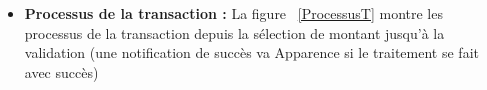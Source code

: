 \begin{itemize}[label=$\ast$]
	
	\item \textbf{Processus de la transaction
		:} La figure ~\ref{ProcessusT} %
	montre les processus de la transaction depuis la sélection de montant jusqu'à la validation (une notification de succès va Apparence si le traitement se fait avec succès)

\end{itemize}
